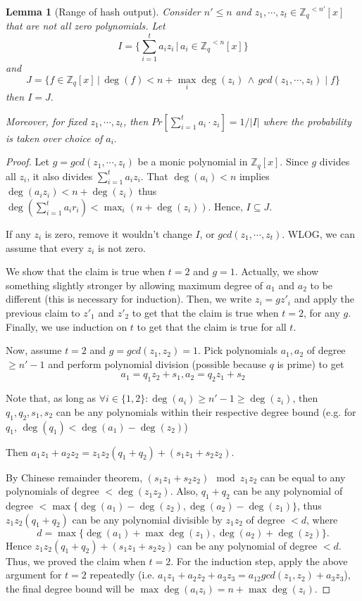 \documentclass[11pt]{article}
\newcommand{\poly}[2]{{#1}^{<#2}[x]}
\newcommand{\abs}[1]{|#1 |}
\newtheorem{lemma}{Lemma}[section]
\begin{document}
\begin{lemma}[Range of hash output]\label{lemma:range}
Consider $n'\leq n$ and $z_1, \cdots, z_t \in \poly{\mathbb{Z}_q}{n'}$ that are not all zero polynomials. Let $$I = \{\sum_{i=1}^t a_i z_i \, | \, a_i\in  \poly{\mathbb{Z}_q}{n} \} $$ and $$J = \{f \in \mathbb{Z}_q[x] \, | \, \deg(f) < n + \max_{i} \deg (z_i) \, \land \, gcd(z_1, \cdots, z_t) \mid f \}$$ then $I = J.$

Moreover, for fixed $z_1, \cdots, z_t$, then $Pr[\sum_{i=1}^t a_i\cdot z_i] =1/\abs{I}$ where the probability is taken over choice of $a_i.$
\end{lemma}
\begin{proof}
Let $g = gcd(z_1, \cdots, z_t)$ be a monic polynomial in $\mathbb{Z}_q[x]$. Since $g$ divides all $z_i$, it also divides $\sum_{i=1}^t a_i z_i$. That $\deg(a_i) < n$ implies $\deg(a_i z_i) < n + \deg(z_i)$ thus $\deg(\sum_{i=1}^t a_i r_i) < \max_i (n+ \deg (z_i)) $. Hence,  $I \subseteq J.$ 

If any $z_i$ is zero, remove it wouldn't change $I$, or $gcd(z_1,\cdots, z_t).$ WLOG, we can assume that every $z_i$ is not zero.

We show that the claim is true when $t =2 $ and $g = 1$. Actually, we show something slightly stronger by allowing maximum degree of $a_1$ and $a_2$ to be different (this is necessary for induction). Then, we write $z_i = g z'_i$ and apply the previous claim to $z'_1$ and $z'_2$ to get that the claim is true when $t=2$, for any $g$. Finally, we use induction on $t$ to get that the claim is true for all $t.$
 
Now, assume $t = 2$ and $g = gcd(z_1, z_2) = 1$. Pick polynomials $a_1, a_2 $ of degree $\geq n'-1$ and perform polynomial division (possible because $q$ is prime) to get $$a_1 = q_ 1z_2 + s_1, a_2 = q_2 z_1 +s_2$$

Note that, as long as $\forall i \in \{1,2\}: \deg(a_i) \geq n'-1 \geq \deg(z_i)$, then $q_1, q_2, s_1, s_2$ can be any polynomials within their respective degree bound  (e.g. for $q_1$, $\deg (q_1) < \deg(a_1) - \deg(z_2)$)

Then $a_1 z_1 + a_2 z_2 = z_1 z_2 (q_1 + q_2) + (s_1 z_1 + s_2 z_2).$

By Chinese remainder theorem, $(s_1 z_1 + s_2 z_2) \mod z_1 z_2$ can be equal to any polynomials of degree $< \deg(z_1 z_2)$. Also, $q_1 + q_2$ can be any polynomial of degree $< \max \{ \deg(a_1) - \deg(z_2), \deg(a_2) - \deg (z_1)\} $, thus $z_1 z_2 (q_1 + q_2)$ can be any polynomial divisible by $z_1 z_2$ of degree 
$< d$, where 
$$d= \max\{\deg(a_1) + \max\deg(z_1), \deg (a_2) + \deg (z_2)\}.$$
Hence $z_1 z_2 (q_1 + q_2) + (s_1 z_1 + s_2 z_2)$ can be any polynomial of degree $< d.$ Thus, we proved the claim when $t=2$. For the induction step, apply the above argument for $t=2$ repeatedly (i.e. $a_1 z_1 + a_2 z_2 +a_3 z_3 = a_{12} gcd(z_1, z_2)  + a_3 z_3$), the final degree bound will be $\max \deg (a_i z_i) = n + \max \deg (z_i).$


\end{proof}
\end{document}
